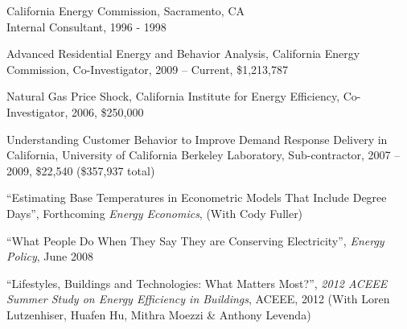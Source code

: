 \documentclass[Computer Science]{vita}
\begin{document}
\begin{vita}
\begin{Experience}
  \item California Energy Commission, Sacramento, CA\\
    Internal Consultant, 1996 - 1998
	  \end{Experience}

 \begin{Selected Grants and Sponsored Research}

\item Advanced Residential Energy and Behavior Analysis, California Energy Commission, Co-Investigator, 2009 -- Current, \$1,213,787

  \item Natural Gas Price Shock, California Institute for Energy
    Efficiency, Co-Investigator, 2006, \$250,000


  \item Understanding Customer Behavior to Improve Demand Response Delivery in California, University of California Berkeley Laboratory, Sub-contractor, 2007 -- 2009, \$22,540 (\$357,937 total)


  \end{Selected Grants and Sponsored Research}

  \begin{Selected Publications}


    \begin{Papers in Refereed Journals}
    
   \item ``Estimating Base Temperatures in Econometric Models That Include Degree Days'', Forthcoming \emph{Energy Economics},  (With Cody Fuller)
   
    \item ``What People Do When They Say They are Conserving
      Electricity'', \emph{Energy Policy}, June 2008



    \end{Papers in Refereed Journals}

    \begin{Papers at Refereed Conferences}
    \item ``Lifestyles, Buildings and Technologies: What Matters Most?'', \emph{2012 ACEEE Summer Study
        on Energy Efficiency in Buildings}, ACEEE, 2012 (With Loren Lutzenhiser, Huafen Hu, Mithra Moezzi \& Anthony Levenda)


\end{Papers at Refereed Conferences}
\end{Selected Publications}
\end{vita}
\end{document}
